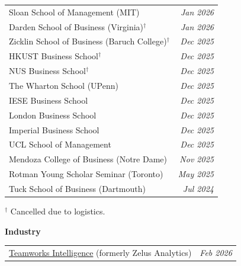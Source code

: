 \documentclass[11pt]{article}
\begin{document}
\begin{tabularx}{\textwidth}{@{}X r@{}}
Sloan School of Management (MIT)                              & \textit{Jan 2026}  \\[1pt]
Darden School of Business (Virginia)$^\dagger$                & \textit{Jan 2026}  \\[1pt]
Zicklin School of Business (Baruch College)$^\dagger$         & \textit{Dec 2025}  \\[1pt]
HKUST Business School$^\dagger$                               & \textit{Dec 2025}  \\[1pt]
NUS Business School$^\dagger$                                 & \textit{Dec 2025}  \\[1pt]
The Wharton School (UPenn)                                    & \textit{Dec 2025}  \\[1pt]
IESE Business School                                          & \textit{Dec 2025}  \\[1pt]
London Business School                                        & \textit{Dec 2025}  \\[1pt]
Imperial Business School                                      & \textit{Dec 2025}  \\[1pt]
UCL School of Management                                      & \textit{Dec 2025}  \\[1pt]
Mendoza College of Business (Notre Dame)                      & \textit{Nov 2025}  \\[1pt]
Rotman Young Scholar Seminar (Toronto)                        & \textit{May 2025}  \\[1pt]
Tuck School of Business (Dartmouth)                           & \textit{Jul 2024}  \\
\end{tabularx}

\vspace{2pt}
{\small\textcolor{agray}{$^\dagger$ Cancelled due to logistics.}}

\vspace{8pt}

\noindent\textbf{Industry}
\vspace{2pt}

\begin{tabularx}{\textwidth}{@{}X r@{}}
\textcolor{ptblue}{\href{https://teamworks.com/intelligence/}{Teamworks Intelligence}} (formerly Zelus Analytics) & \textit{Feb 2026} \\
\end{tabularx}
\end{document}
